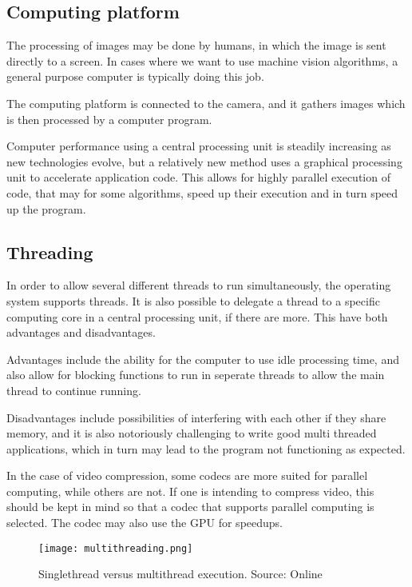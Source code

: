 \subsection{Computing platform}
The processing of images may be done by humans, in which the image is sent directly to a screen. In cases where we want to use machine vision algorithms, a general purpose computer is typically doing this job.

The computing platform is connected to the camera, and it gathers images which is then processed by a computer program.

Computer performance using a central processing unit is steadily increasing as new technologies evolve, but a relatively new method uses a graphical processing unit to accelerate application code. This allows for highly parallel execution of code, that may for some algorithms, speed up their execution and in turn speed up the program.

\subsection{Threading}
In order to allow several different threads to run simultaneously, the operating system supports threads. It is also possible to delegate a thread to a specific computing core in a central processing unit, if there are more. This have both advantages and disadvantages.

Advantages include the ability for the computer to use idle processing time, and also allow for blocking functions to run in seperate threads to allow the main thread to continue running.

Disadvantages include possibilities of interfering with each other if they share memory, and it is also notoriously challenging to write good multi threaded applications, which in turn may lead to the program not functioning as expected.

In the case of video compression, some codecs are more suited for parallel computing, while others are not. If one is intending to compress video, this should  be kept in mind so that a codec that supports parallel computing is selected. The codec may also use the GPU for speedups.

\begin{figure}[ht]
    \centering
    \texttt{[image: multithreading.png]}
    \caption{Singlethread versus multithread execution. Source: Online \citet{multithreadingcpp15}}
    \label{fig:multithreading}
\end{figure}
\FloatBarrier

